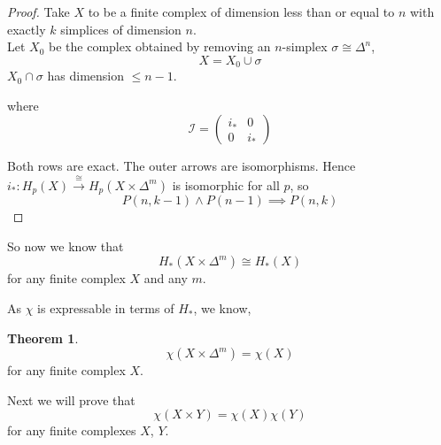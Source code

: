 \documentclass[a4paper,14pt]{extarticle}
\theoremstyle{definition}
\newtheorem*{theorem}{Theorem}
\begin{document}
\begin{proof}
	Take $X$ to be a finite complex of dimension less than or equal to $n$ with exactly 
	$k$ simplices of dimension $n$. \\

	Let $X_0$ be the complex obtained by removing an $n$-simplex $\sigma\cong\Delta^n$, 
	\[X=X_0\cup\sigma\] $X_0\cap\sigma$ has dimension $\leq n-1$.

	\vspace{12pt}
	

\vspace{12pt}

	where \[\mathcal{I}=\begin{pmatrix}
		i_* & 0 \\ 0 & i_*
	\end{pmatrix}\]
	
\vspace{12pt}

	Both rows are exact. The outer arrows are isomorphisms. Hence
	$i_*:H_p(X)\xrightarrow{\cong} H_p(X\times\Delta^m)$ is isomorphic for all $p$, so 
	\[P(n,k-1)\wedge P(n-1)\implies P(n,k)\]
\end{proof}
So now we know that 
\[H_*(X\times\Delta^m)\cong H_*(X)\] for any finite complex $X$ and any $m$.

As $\chi$ is expressable in terms of $H_*$, we know,

\begin{theorem}
	\[\chi(X\times\Delta^m)=\chi(X)\] for any finite complex $X$.
\end{theorem}

Next we will prove that \[\chi(X\times Y)=\chi(X)\chi(Y)\] for any finite complexes 
$X$, $Y$.
\end{document}
